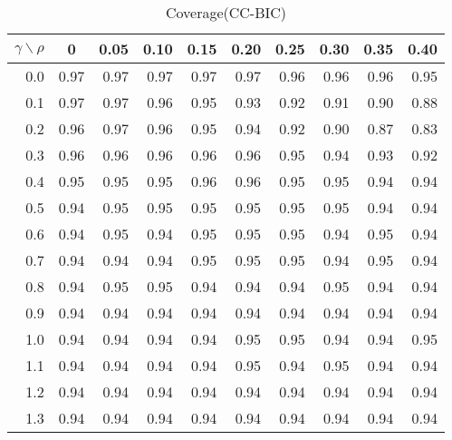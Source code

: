 \documentclass[12pt]{article}
\begin{document}
%
\begin{table}[!tbp]
\caption{Coverage(CC-BIC)}
 \begin{center}
 \begin{tabular}{r|rrrrrrrrr}\hline\hline
\multicolumn{1}{c|}{$\gamma\backslash\rho$}&\multicolumn{1}{c}{0}&\multicolumn{1}{c}{0.05}&\multicolumn{1}{c}{0.10}&\multicolumn{1}{c}{0.15}&\multicolumn{1}{c}{0.20}&\multicolumn{1}{c}{0.25}&\multicolumn{1}{c}{0.30}&\multicolumn{1}{c}{0.35}&\multicolumn{1}{c}{0.40}\tabularnewline
\hline

0.0&0.97&0.97&0.97&0.97&0.97&0.96&0.96&0.96&0.95\tabularnewline
0.1&0.97&0.97&0.96&0.95&0.93&0.92&0.91&0.90&0.88\tabularnewline
0.2&0.96&0.97&0.96&0.95&0.94&0.92&0.90&0.87&0.83\tabularnewline
0.3&0.96&0.96&0.96&0.96&0.96&0.95&0.94&0.93&0.92\tabularnewline
0.4&0.95&0.95&0.95&0.96&0.96&0.95&0.95&0.94&0.94\tabularnewline
0.5&0.94&0.95&0.95&0.95&0.95&0.95&0.95&0.94&0.94\tabularnewline
0.6&0.94&0.95&0.94&0.95&0.95&0.95&0.94&0.95&0.94\tabularnewline
0.7&0.94&0.94&0.94&0.95&0.95&0.95&0.94&0.95&0.94\tabularnewline
0.8&0.94&0.95&0.95&0.94&0.94&0.94&0.95&0.94&0.94\tabularnewline
0.9&0.94&0.94&0.94&0.94&0.94&0.94&0.94&0.94&0.94\tabularnewline
1.0&0.94&0.94&0.94&0.94&0.95&0.95&0.94&0.94&0.95\tabularnewline
1.1&0.94&0.94&0.94&0.94&0.95&0.94&0.95&0.94&0.94\tabularnewline
1.2&0.94&0.94&0.94&0.94&0.94&0.94&0.94&0.94&0.94\tabularnewline
1.3&0.94&0.94&0.94&0.94&0.94&0.94&0.94&0.94&0.94\tabularnewline
\hline
\end{tabular}

\end{center}

\end{table}
\end{document}
